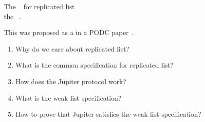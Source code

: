 
\begin{frame}{}
  \begin{center}
    \begin{mdframed}[frametitle = {\large \red{The Main Contribution}}, frametitlerule = true, frametitlebackgroundcolor = brown!20,
      frametitleaboveskip = 8pt, frametitlebelowskip = 8pt, innertopmargin = 10pt]
      {\Large The ~ for replicated list \\
       the ~.} \\[15pt]
    \end{mdframed}

    \pause
    \vspace{0.20cm}
    {\large This was proposed as a  in a PODC paper~.}
  \end{center}
\end{frame}

\begin{frame}{}

  \begin{enumerate}[<+->]
    \setlength{\itemsep}{12pt}
    \item Why do we care about replicated list? 
    \item What is the common specification for replicated list? 
    \item How does the Jupiter protocol work?
    \item What is the weak list specification?
    \item How to prove that Jupiter satisfies the weak list specification?
  \end{enumerate}
\end{frame}
